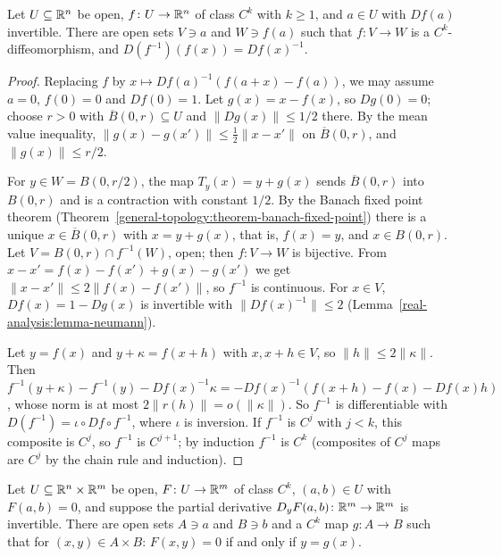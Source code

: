 \begin{theorem}\label{real-analysis:theorem-inverse-function}
Let $U \subseteq \mathbb{R}^n$ be open, $f \colon U \to \mathbb{R}^n$ of class $C^k$ with $k \geq 1$, and $a \in U$ with $Df(a)$ invertible. There are open sets $V \ni a$ and $W \ni f(a)$ such that $f \colon V \to W$ is a
$C^k$-diffeomorphism, and $D(f^{-1})(f(x)) = Df(x)^{-1}$.
\end{theorem}

\begin{proof}
Replacing $f$ by $x \mapsto Df(a)^{-1}(f(a + x) - f(a))$, we may assume $a = 0$, $f(0) = 0$ and $Df(0) = 1$. Let $g(x) = x - f(x)$, so $Dg(0) = 0$; choose $r > 0$ with $\overline{B}(0, r) \subseteq U$ and
$\|Dg(x)\| \leq 1/2$ there. By the mean value inequality, $\|g(x) - g(x')\| \leq \frac12\|x - x'\|$ on $\overline{B}(0, r)$, and $\|g(x)\| \leq r/2$.

For $y \in W = B(0, r/2)$, the map $T_y(x) = y + g(x)$ sends $\overline{B}(0, r)$ into $B(0, r)$ and is a contraction with constant $1/2$. By the Banach fixed point theorem
(Theorem~\ref{general-topology:theorem-banach-fixed-point}) there is a unique $x \in \overline{B}(0, r)$ with $x = y + g(x)$, that is, $f(x) = y$, and $x \in B(0, r)$. Let $V = B(0, r) \cap f^{-1}(W)$, open; then
$f \colon V \to W$ is bijective. From $x - x' = f(x) - f(x') + g(x) - g(x')$ we get $\|x - x'\| \leq 2\|f(x) - f(x')\|$, so $f^{-1}$ is continuous. For $x \in V$, $Df(x) = 1 - Dg(x)$ is invertible
with $\|Df(x)^{-1}\| \leq 2$ (Lemma~\ref{real-analysis:lemma-neumann}).

Let $y = f(x)$ and $y + \kappa = f(x + h)$ with $x, x + h \in V$, so $\|h\| \leq 2\|\kappa\|$. Then $f^{-1}(y + \kappa) - f^{-1}(y) - Df(x)^{-1}\kappa = -Df(x)^{-1}(f(x + h) - f(x) - Df(x)h)$, whose norm is
at most $2\|r(h)\| = o(\|\kappa\|)$. So $f^{-1}$ is differentiable with $D(f^{-1}) = \iota \circ Df \circ f^{-1}$, where $\iota$ is inversion. If $f^{-1}$ is $C^j$ with $j < k$, this composite is $C^j$, so
$f^{-1}$ is $C^{j+1}$; by induction $f^{-1}$ is $C^k$ (composites of $C^j$ maps are $C^j$ by the chain rule and induction).
\end{proof}

\begin{theorem}\label{real-analysis:theorem-implicit-function}
Let $U \subseteq \mathbb{R}^n \times \mathbb{R}^m$ be open, $F \colon U \to \mathbb{R}^m$ of class $C^k$, $(a, b) \in U$ with $F(a, b) = 0$, and suppose the partial derivative $D_yF(a, b) \colon \mathbb{R}^m \to \mathbb{R}^m$ is invertible.
There are open sets $A \ni a$ and $B \ni b$ and a $C^k$ map $g \colon A \to B$ such that for $(x, y) \in A \times B$: $F(x, y) = 0$ if and only if $y = g(x)$.
\end{theorem}

